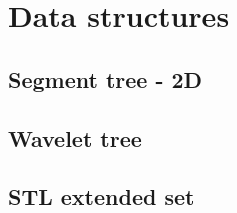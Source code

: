 

\def\title{Universidad Nacional de Córdoba}

\section{Data structures}
\subsection{Segment tree - 2D}
\subsection{Wavelet tree}
\subsection{STL extended set}
